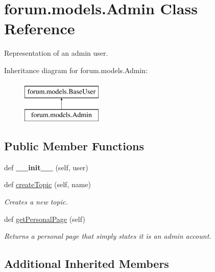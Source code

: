 \hypertarget{classforum_1_1models_1_1_admin}{}\section{forum.\+models.\+Admin Class Reference}
\label{classforum_1_1models_1_1_admin}


Representation of an admin user.  


Inheritance diagram for forum.\+models.\+Admin\+:\begin{figure}[H]
\begin{center}
\leavevmode
\includegraphics[height=2.000000cm]{classforum_1_1models_1_1_admin}
\end{center}
\end{figure}
\subsection*{Public Member Functions}
\begin{DoxyCompactItemize}
\item 
\mbox{\label{classforum_1_1models_1_1_admin_a11f45c800a686b2a7a8321abe0a515f1}} 
def {\bfseries \+\_\+\+\_\+init\+\_\+\+\_\+} (self, user)
\item 
def \mbox{\hyperlink{classforum_1_1models_1_1_admin_aed8021d22941a872674e8ea35bbea7f4}{create\+Topic}} (self, name)
\begin{DoxyCompactList}\small\item\em Creates a new topic. \end{DoxyCompactList}\item 
def \mbox{\hyperlink{classforum_1_1models_1_1_admin_a515dd47f6f4f8d93cf8c346af2484673}{get\+Personal\+Page}} (self)
\begin{DoxyCompactList}\small\item\em Returns a personal page that simply states it is an admin account. \end{DoxyCompactList}\end{DoxyCompactItemize}
\subsection*{Additional Inherited Members}


